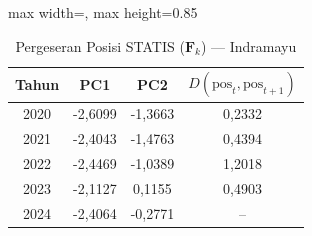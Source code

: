 \begin{table}[H]
\centering
\caption{Pergeseran Posisi STATIS ($\mathbf{F}_k$) --- Indramayu} \label{tab:app1jarak_statis_skor_indramayu}
\begin{adjustbox}{max width=\textwidth, max height=0.85\textheight}
\begin{tabular}{|c|c|c|c|}
\hline
\textbf{Tahun} & \textbf{PC1} & \textbf{PC2} & \textbf{$D(\text{pos}_t, \text{pos}_{t+1})$} \\
\hline
2020 & -2,6099 & -1,3663 & 0,2332 \\
2021 & -2,4043 & -1,4763 & 0,4394 \\
2022 & -2,4469 & -1,0389 & 1,2018 \\
2023 & -2,1127 & 0,1155 & 0,4903 \\
2024 & -2,4064 & -0,2771 & -- \\
\hline
\end{tabular}
\end{adjustbox}
\end{table}